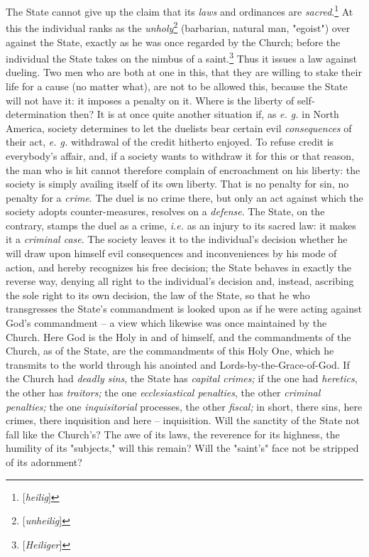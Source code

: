 The State cannot give up the claim that its \textit{laws} and ordinances are 
\textit{sacred}.\footnote{[\textit{heilig}]} At this the individual ranks as 
the \textit{unholy}\footnote{[\textit{unheilig}]} (barbarian, natural man, 
"{}egoist"{}) over against the State, exactly as he was once regarded by the 
Church; before the individual the State takes on the nimbus of a 
saint.\footnote{[\textit{Heiliger}]} Thus it issues a law against dueling. Two 
men who are both at one in this, that they are willing to stake their life for 
a cause (no matter what), are not to be allowed this, because the State will 
not have it: it imposes a penalty on it. Where is the liberty of 
self-determination then? It is at once quite another situation if, as 
\textit{e. g.} in North America, society determines to let the duelists bear 
certain evil \textit{consequences} of their act, \textit{e. g.} withdrawal of 
the credit hitherto enjoyed. To refuse credit is everybody's affair, and, if a 
society wants to withdraw it for this or that reason, the man who is hit 
cannot therefore complain of encroachment on his liberty: the society is 
simply availing itself of its own liberty. That is no penalty for sin, no 
penalty for a \textit{crime}. The duel is no crime there, but only an act 
against which the society adopts counter-measures, resolves on a 
\textit{defense}. The State, on the contrary, stamps the duel as a crime, 
\textit{i.e.} as an injury to its sacred law: it makes it a \textit{criminal 
case}. The society leaves it to the individual's decision whether he will draw 
upon himself evil consequences and inconveniences by his mode of action, and 
hereby recognizes his free decision; the State behaves in exactly the reverse 
way, denying all right to the individual's decision and, instead, ascribing 
the sole right to its own decision, the law of the State, so that he who 
transgresses the State's commandment is looked upon as if he were acting 
against God's commandment -- a view which likewise was once maintained by the 
Church. Here God is the Holy in and of himself, and the commandments of the 
Church, as of the State, are the commandments of this Holy One, which he 
transmits to the world through his anointed and Lords-by-the-Grace-of-God. If 
the Church had \textit{deadly sins}, the State has \textit{capital crimes;} if 
the one had \textit{heretics}, the other has \textit{traitors;} the one 
\textit{ecclesiastical penalties}, the other \textit{criminal penalties;} the 
one \textit{inquisitorial} processes, the other \textit{fiscal;} in short, 
there sins, here crimes, there inquisition and here -- inquisition. Will the 
sanctity of the State not fall like the Church's? The awe of its laws, the 
reverence for its highness, the humility of its "{}subjects,"{} will this 
remain? Will the "{}saint's"{} face not be stripped of its adornment?

